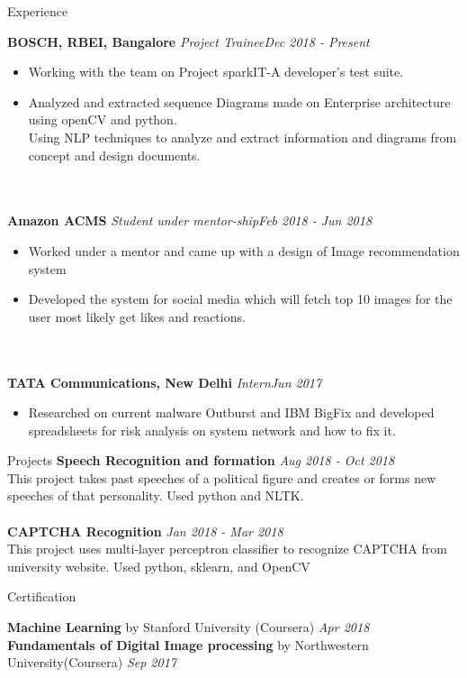 \documentclass{resume} %
\begin{document}
\begin{rSection}{Experience}

{\bf BOSCH, RBEI, Bangalore} \textit{Project Trainee}\hfill {\em Dec 2018 - Present}
\begin{itemize}
\item Working with the team on Project sparkIT-A developer's test suite.
\item Analyzed and extracted sequence Diagrams made on Enterprise architecture using openCV and python.
\\ Using NLP techniques to analyze and extract information and diagrams from concept and design documents.
\end{itemize}
\\
\\
{\bf Amazon ACMS} \textit{Student under mentor-ship}\hfill {\em Feb 2018 - Jun 2018}
\begin{itemize}
\item Worked under a mentor and came up with a design  of Image recommendation system
\item Developed the system for social media which will fetch top 10 images for the user most likely get likes and reactions.
\end{itemize}
\\
\\
{\bf TATA Communications, New Delhi} \textit{Intern}\hfill {\em Jun 2017}
\begin{itemize}
\item Researched on current malware Outburst and IBM BigFix and developed spreadsheets for risk analysis on system network and how to fix it. 
\end{itemize}
\end{rSection}


\begin{rSection}{Projects} \itemsep -2pt
{\bf Speech Recognition and formation } \hfill {\em Aug 2018 - Oct 2018} 
\\ This project takes past speeches of a political figure and creates or forms new speeches of that personality. Used python and NLTK.
\\
\\
{\bf CAPTCHA Recognition} \hfill {\em Jan 2018 - Mar 2018}
\\ This project uses multi-layer perceptron classifier to recognize CAPTCHA from university website. Used python, sklearn, and OpenCV 
\end{rSection}

\begin{rSection}{Certification}

{\bf Machine Learning} by Stanford University (Coursera)  \hfill {\em Apr 2018}
\\
{\bf Fundamentals of Digital Image processing} by Northwestern University(Coursera)  \hfill {\em Sep 2017}
\end{rSection}
\end{document}
